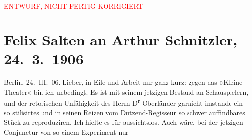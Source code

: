 
\begin{center}
            \textcolor{red}{ENTWURF, NICHT FERTIG KORRIGIERT}
                      \end{center}
            
         
         \renewcommand{\erwaehntePersonen}{Personen: Hermann Bahr, Hans Oberländer, Max Reinhardt, Ottilie Salten, Olga Schnitzler}
         \renewcommand{\erwaehnteInstitutionen}{Institutionen: Deutsches Theater Berlin, Kleines Theater}
         \renewcommand{\erwaehnteOrte}{Orte: Berlin, Wien}
         \renewcommand{\erwaehnteWerke}{Werke: Zum großen Wurstel. Burleske in einem Akt}
               \section[Felix Salten an Arthur Schnitzler, 24. 3. 1906]{ Felix Salten an Arthur Schnitzler, 24. 3. 1906}\nopagebreak{}\rehead{ }\begin{ledgroupsized}[t]{13cm}\normalsize\beginnumbering \toendnotes[C]{\smallbreak\pagebreak[2]} 
\toendnotes[C]{\smallbreak}\pstart
           \raggedleft{}{\pb}Berlin, 24. III. 06.
               \pend
           \pstart
           Lieber, in Eile und Arbeit nur ganz kurz: gegen das »Kleine Theater« bin ich unbedingt. Es ist mit seinem jetzigen
               Bestand an Schauspielern, und der retorischen Unfähigkeit des Herrn D\textsuperscript{r}{ }Oberländer garnicht imstande ein so
               stilisirtes und in seinen Reizen vom Dutzend-Regisseur so schwer auffindbares Stück zu reproduziren. Ich hielte es für
               aussichtslos. Auch wäre, bei der jetzigen Conjunctur von so einem Experiment nur

\end{ledgroupsized}
